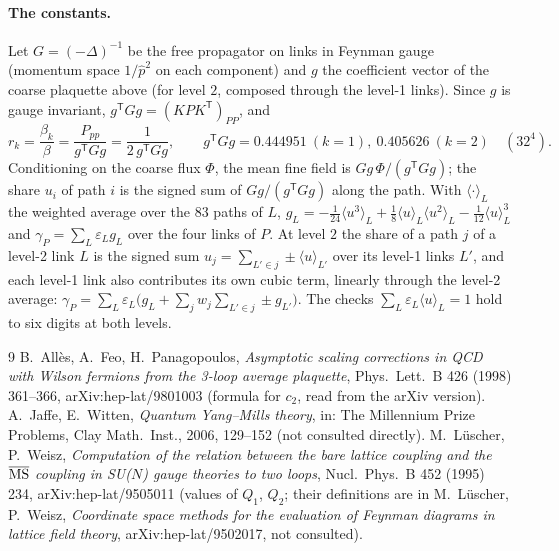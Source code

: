 \documentclass[11pt,a4paper]{article}
\theoremstyle{definition}
\theoremstyle{remark}
\begin{document}
\paragraph{The constants.} Let $G=(-\Delta)^{-1}$ be the free propagator on links in Feynman gauge (momentum space $1/\hat p^2$ on each component) and $g$ the coefficient vector of the coarse plaquette above (for level $2$, composed through the level-1 links). Since $g$ is gauge invariant, $g^{\mathsf T}Gg=(KPK^{\mathsf T})_{PP}$, and
\[
r_k=\frac{\beta_k}{\beta}=\frac{P_{pp}}{g^{\mathsf T}Gg}=\frac1{2\,g^{\mathsf T}Gg},\qquad g^{\mathsf T}Gg=0.444951\ (k=1),\ 0.405626\ (k=2)\quad(32^4).
\]
Conditioning on the coarse flux $\Phi$, the mean fine field is $Gg\,\Phi/(g^{\mathsf T}Gg)$; the share $u_i$ of path $i$ is the signed sum of $Gg/(g^{\mathsf T}Gg)$ along the path. With $\langle\cdot\rangle_L$ the weighted average over the 83 paths of $L$, $g_L=-\frac1{24}\langle u^3\rangle_L+\frac18\langle u\rangle_L\langle u^2\rangle_L-\frac1{12}\langle u\rangle_L^3$ and $\gamma_P=\sum_L\varepsilon_Lg_L$ over the four links of $P$. At level $2$ the share of a path $j$ of a level-2 link $L$ is the signed sum $u_j=\sum_{L'\in j}\pm\langle u\rangle_{L'}$ over its level-1 links $L'$, and each level-1 link also contributes its own cubic term, linearly through the level-2 average: $\gamma_P=\sum_L\varepsilon_L\bigl(g_L+\sum_jw_j\sum_{L'\in j}\pm g_{L'}\bigr)$. The checks $\sum_L\varepsilon_L\langle u\rangle_L=1$ hold to six digits at both levels.

{\small
\begin{thebibliography}{9}
 B.~Allès, A.~Feo, H.~Panagopoulos, \emph{Asymptotic scaling corrections in QCD with Wilson fermions from the 3-loop average plaquette}, Phys.\ Lett.\ B 426 (1998) 361--366, arXiv:hep-lat/9801003 (formula for $c_2$, read from the arXiv version).
 A.~Jaffe, E.~Witten, \emph{Quantum Yang--Mills theory}, in: The Millennium Prize Problems, Clay Math.\ Inst., 2006, 129--152 (not consulted directly).
 M.~Lüscher, P.~Weisz, \emph{Computation of the relation between the bare lattice coupling and the $\overline{\rm MS}$ coupling in SU($N$) gauge theories to two loops}, Nucl.\ Phys.\ B 452 (1995) 234, arXiv:hep-lat/9505011 (values of $Q_1$, $Q_2$; their definitions are in M.~Lüscher, P.~Weisz, \emph{Coordinate space methods for the evaluation of Feynman diagrams in lattice field theory}, arXiv:hep-lat/9502017, not consulted).
\end{thebibliography}}
\end{document}
